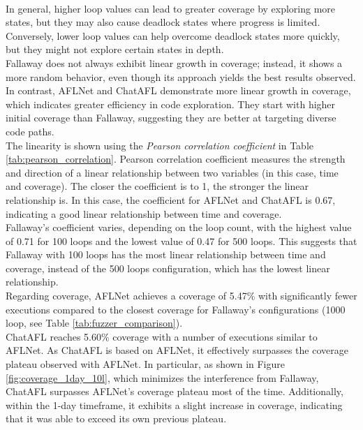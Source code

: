 \\In general, higher loop values can lead to greater coverage by exploring more states, but they may also cause deadlock states where progress is limited. Conversely, lower loop values can help overcome deadlock states more quickly, but they might not explore certain states in depth.
\\Fallaway does not always exhibit linear growth in coverage; instead, it shows a more random behavior, even though its approach yields the best results observed. In contrast, AFLNet and ChatAFL demonstrate more linear growth in coverage, which indicates greater efficiency in code exploration. They start with higher initial coverage than Fallaway, suggesting they are better at targeting diverse code paths.
\\The linearity is shown using the \textit{Pearson correlation coefficient} in Table \ref{tab:pearson_correlation}.
Pearson correlation coefficient measures the strength and direction of a linear relationship between two variables (in this case, time and coverage). The closer the coefficient is to 1, the stronger the linear relationship is.
In this case, the coefficient for AFLNet and ChatAFL is 0.67, indicating a good linear relationship between time and coverage.
\\Fallaway's coefficient varies, depending on the loop count, with the highest value of 0.71 for 100 loops and the lowest value of 0.47 for 500 loops. This suggests that Fallaway with 100 loops has the most linear relationship between time and coverage, instead of the 500 loops configuration, which has the lowest linear relationship.
\\Regarding coverage, AFLNet achieves a coverage of 5.47\% with significantly fewer executions compared to the closest coverage for Fallaway's configurations (1000 loop, see Table \ref{tab:fuzzer_comparison}).
\\ChatAFL reaches 5.60\% coverage with a number of executions similar to AFLNet. As ChatAFL is based on AFLNet, it effectively surpasses the coverage plateau observed with AFLNet. In particular, as shown in Figure \ref{fig:coverage_1day_10l}, which minimizes the interference from Fallaway, ChatAFL surpasses AFLNet's coverage plateau most of the time. Additionally, within the 1-day timeframe, it exhibits a slight increase in coverage, indicating that it was able to exceed its own previous plateau.
